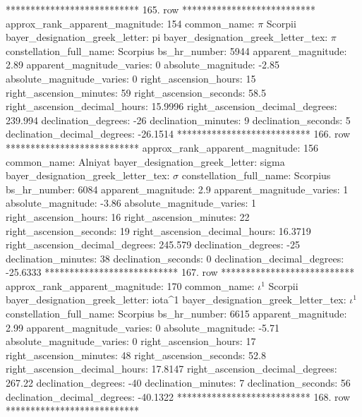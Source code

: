 *************************** 165. row ***************************
    approx_rank_apparent_magnitude: 154
                       common_name: $\pi$ Scorpii
    bayer_designation_greek_letter: pi
bayer_designation_greek_letter_tex: $\pi$
           constellation_full_name: Scorpius
                      bs_hr_number: 5944
                apparent_magnitude: 2.89
         apparent_magnitude_varies: 0
                absolute_magnitude: -2.85
         absolute_magnitude_varies: 0
             right_ascension_hours: 15
           right_ascension_minutes: 59
           right_ascension_seconds: 58.5
     right_ascension_decimal_hours: 15.9996
   right_ascension_decimal_degrees: 239.994
               declination_degrees: -26
               declination_minutes: 9
               declination_seconds: 5
       declination_decimal_degrees: -26.1514
*************************** 166. row ***************************
    approx_rank_apparent_magnitude: 156
                       common_name: Alniyat
    bayer_designation_greek_letter: sigma
bayer_designation_greek_letter_tex: $\sigma$
           constellation_full_name: Scorpius
                      bs_hr_number: 6084
                apparent_magnitude: 2.9
         apparent_magnitude_varies: 1
                absolute_magnitude: -3.86
         absolute_magnitude_varies: 1
             right_ascension_hours: 16
           right_ascension_minutes: 22
           right_ascension_seconds: 19
     right_ascension_decimal_hours: 16.3719
   right_ascension_decimal_degrees: 245.579
               declination_degrees: -25
               declination_minutes: 38
               declination_seconds: 0
       declination_decimal_degrees: -25.6333
*************************** 167. row ***************************
    approx_rank_apparent_magnitude: 170
                       common_name: $\iota^1$ Scorpii
    bayer_designation_greek_letter: iota^1
bayer_designation_greek_letter_tex: $\iota^1$
           constellation_full_name: Scorpius
                      bs_hr_number: 6615
                apparent_magnitude: 2.99
         apparent_magnitude_varies: 0
                absolute_magnitude: -5.71
         absolute_magnitude_varies: 0
             right_ascension_hours: 17
           right_ascension_minutes: 48
           right_ascension_seconds: 52.8
     right_ascension_decimal_hours: 17.8147
   right_ascension_decimal_degrees: 267.22
               declination_degrees: -40
               declination_minutes: 7
               declination_seconds: 56
       declination_decimal_degrees: -40.1322
*************************** 168. row ***************************
